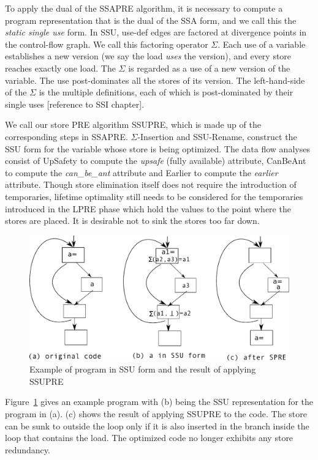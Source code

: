 To apply the dual of the SSAPRE algorithm, it is necessary to compute a program
representation that is the dual of the SSA form, and we call this the 
\emph{static single use} form.  In SSU, use-def edges are factored at
divergence points in the control-flow graph.  We call this factoring operator
$\Sigma$.  Each use of a variable establishes a new version (we say the load 
\emph{uses} the version), and every store reaches exactly one load.   The
$\Sigma$ is regarded as a use of a new version of the variable.  The use
post-dominates all the stores of its version.  The left-hand-side of the
$\Sigma$ is the multiple definitions, each of which is post-dominated by their
single uses [reference to SSI chapter].

We call our store PRE algorithm SSUPRE, which is made up of the corresponding 
steps in SSAPRE.   $\Sigma$-Insertion and
SSU-Rename, construct the SSU form for the variable whose store is being 
optimized.  The data flow analyses consist of UpSafety to compute the
\emph{upsafe} (fully available) attribute, CanBeAnt to compute the
\emph{can\_be\_ant} attribute and Earlier to compute the \emph{earlier}
attribute.  Though store elimination itself does not require
the introduction of temporaries, lifetime optimality still needs to be
considered for the temporaries introduced in the LPRE phase which hold the 
values to the point where the stores are placed.  It is desirable not 
to sink the stores too far down.  

\begin{figure}
\centering
\includegraphics[scale=0.55]{fig-ssupre.pdf}
\caption{Example of program in SSU form and the result of applying SSUPRE}
\label{fig: ssupre}
\end{figure}

Figure~\ref{fig: ssupre} gives an example program with (b) being the SSU 
representation for the program in (a).  
(c) shows the result of applying SSUPRE to the code.
The store can be sunk to outside the loop only if it is also inserted in
the branch inside the loop that contains the load.  The optimized code no
longer exhibits any store redundancy.

